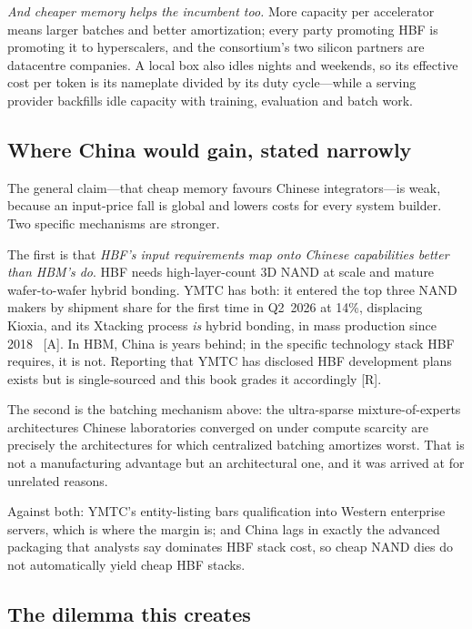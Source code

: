 \emph{And cheaper memory helps the incumbent too.} More capacity per accelerator means larger batches and better amortization; every party promoting HBF is promoting it to hyperscalers, and the consortium's two silicon partners are datacentre companies. A local box also idles nights and weekends, so its effective cost per token is its nameplate divided by its duty cycle---while a serving provider backfills idle capacity with training, evaluation and batch work.

\subsection{Where China would gain, stated narrowly}

The general claim---that cheap memory favours Chinese integrators---is weak, because an input-price fall is global and lowers costs for every system builder. Two specific mechanisms are stronger.

The first is that \emph{HBF's input requirements map onto Chinese capabilities better than HBM's do}. HBF needs high-layer-count 3D NAND at scale and mature wafer-to-wafer hybrid bonding. YMTC has both: it entered the top three NAND makers by shipment share for the first time in Q2~2026 at 14\%, displacing Kioxia, and its Xtacking process \emph{is} hybrid bonding, in mass production since 2018~\cite{ymtc-nand} [A]. In HBM, China is years behind; in the specific technology stack HBF requires, it is not. Reporting that YMTC has disclosed HBF development plans exists but is single-sourced and this book grades it accordingly [R].

The second is the batching mechanism above: the ultra-sparse mixture-of-experts architectures Chinese laboratories converged on under compute scarcity are precisely the architectures for which centralized batching amortizes worst. That is not a manufacturing advantage but an architectural one, and it was arrived at for unrelated reasons.

Against both: YMTC's entity-listing bars qualification into Western enterprise servers, which is where the margin is; and China lags in exactly the advanced packaging that analysts say dominates HBF stack cost, so cheap NAND dies do not automatically yield cheap HBF stacks.

\subsection{The dilemma this creates}

